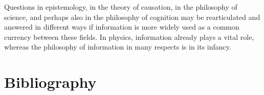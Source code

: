 \documentclass[11pt]{article}
\begin{document}
Questions in epistemology, in the theory of causation, in the
philosophy of science, and perhaps also in the philosophy of cognition
may be rearticulated and answered in different ways if information is
more widely used as a common currency between these fields. In
physics, information already plays a vital role, whereas the
philosophy of information in many respects is in its infancy.

\section{Bibliography}
\label{Bibliography}

 

\end{document}
